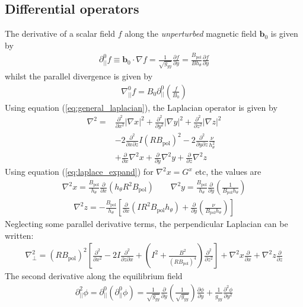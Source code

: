 \documentclass[12pt]{article}
\def\L{\left}
\def\R{\right}
\newcommand{\deriv}[2]{\ensuremath{\frac{\partial #1}{\partial #2}}}
\newcommand{\dderiv}[2]{\ensuremath{\frac{\partial^2 #1}{\partial {#2}^2}}}
\newcommand{\hthe}{\ensuremath{h_\theta}}
\newcommand{\Bp}{\ensuremath{B_{\text{pol}}}}
\newcommand{\ve}[1]{\ensuremath{\boldsymbol{#1}}}
\newcommand{\delp}{\nabla_\perp^2}
\newcommand{\rbp}{\ensuremath{R\Bp}}
\newcommand{\rbpsq}{\ensuremath{\L(\rbp\R)^2}}
\begin{document}
\subsection{Differential operators}
%
The derivative of a scalar field $f$ along the \emph{unperturbed} magnetic
field $\ve{b}_0$ is given by
%
\begin{align*}
\partial^0_{||}f \equiv \ve{b}_0 \cdot\nabla f =
\frac{1}{\sqrt{g_{yy}}}\deriv{f}{y} = \frac{\Bp}{B\hthe}\deriv{f}{y}
\end{align*}
%
whilst the parallel divergence is given by
%
\begin{align*}
\nabla^0_{||}f = B_0\partial^0_{||}\L(\frac{f}{B_0}\R)
\end{align*}
%
Using equation (\ref{eq:general_laplacian}), the Laplacian operator is given by
%
\begin{align*}
\nabla^2 = &\frac{\partial^2}{\partial x^2}\L|\nabla x\R|^2 +
    \frac{\partial^2}{\partial y^2}\L|\nabla y\R|^2 +
    \frac{\partial^2}{\partial z^2}\L|\nabla z\R|^2 \nonumber \\
    &-2\frac{\partial^2}{\partial x\partial z}I\L(R\Bp\R)^2 -
    2\frac{\partial^2}{\partial y\partial z}\frac{\nu}{h_\theta^2}\\
    &+\frac{\partial}{\partial x}\nabla^2x + \frac{\partial}{\partial
y}\nabla^2y + \frac{\partial}{\partial z}\nabla^2z \nonumber
\end{align*}
%
Using equation (\ref{eq:laplace_expand}) for $\nabla^2x = G^x$ etc, the values
are
%
\begin{align*}
\nabla^2x = \frac{\Bp}{h_\theta}\frac{\partial}{\partial x}\L(h_\theta
R^2\Bp\R) \qquad \nabla^2y = \frac{\Bp}{h_\theta}\frac{\partial}{\partial
y}\L(\frac{1}{\Bp h_\theta}\R)
\end{align*}
%
\begin{align*}
\nabla^2z = -\frac{\Bp}{h_\theta}\L[\frac{\partial}{\partial x}\L(IR^2\Bp
h_\theta\R) + \frac{\partial}{\partial y}\L(\frac{\nu}{\Bp h_\theta}\R)\R]
\end{align*}
%
Neglecting some parallel derivative terms, the perpendicular Laplacian can be
written:
%
\begin{align*}
\delp = \rbpsq\L[\dderiv{}{x} - 2I\frac{\partial^2}{\partial z\partial x} +
\L(I^2 + \frac{B^2}{\L(\rbp\R)^4}\R)\dderiv{}{z}\R] + \nabla^2 x \deriv{}{x} +
\nabla^2 z\deriv{}{z}
\end{align*}
%
The second derivative along the equilibrium field
%
\begin{align*}
\partial^2_{||}\phi = \partial^0_{||}\L(\partial^0_{||}\phi\R) =
\frac{1}{\sqrt{g_{yy}}}\deriv{}{y}\L(\frac{1}{\sqrt{g_{yy}}}\R)\deriv{ \phi}{y}
+ \frac{1}{g_{yy}}\frac{\partial^2\phi}{\partial y^2}
\end{align*}
\end{document}
